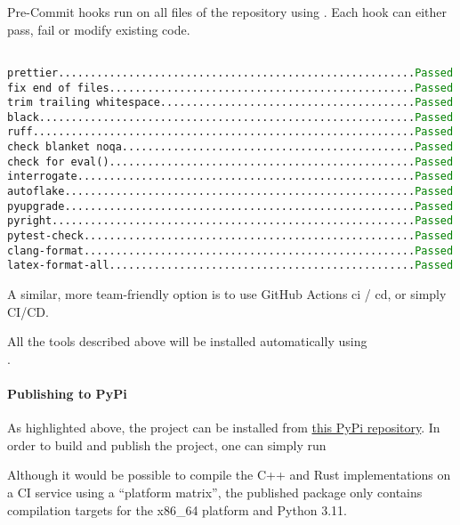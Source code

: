 \begin{table}
  \centering
  \caption{Pre-Commit hooks run on all files of the repository using . Each hook can either pass, fail or modify existing code.}
  \texttt{
    \hspace*{-1em} prettier........................................................\textcolor{green}{Passed} \\
    fix end of files................................................\textcolor{green}{Passed} \\
    trim trailing whitespace........................................\textcolor{green}{Passed} \\
    black...........................................................\textcolor{green}{Passed} \\
    ruff............................................................\textcolor{green}{Passed} \\
    check blanket noqa..............................................\textcolor{green}{Passed} \\
    check for eval()................................................\textcolor{green}{Passed} \\
    interrogate.....................................................\textcolor{green}{Passed} \\
    autoflake.......................................................\textcolor{green}{Passed} \\
    pyupgrade.......................................................\textcolor{green}{Passed} \\
    pyright.........................................................\textcolor{green}{Passed} \\
    pytest-check....................................................\textcolor{green}{Passed} \\
    clang-format....................................................\textcolor{green}{Passed} \\
    latex-format-all................................................\textcolor{green}{Passed}
  }
\end{table}

A similar, more team-friendly option is to use GitHub Actions \gls{ci} / \gls{cd}, or simply CI/CD.

All the tools described above will be installed automatically using \\
.

\paragraph{Publishing to PyPi}
As highlighted above, the project can be installed from \href{https://pypi.org/project/melon-scheduler/}{this PyPi repository}.
In order to build and publish the project, one can simply run


Although it would be possible to compile the C++ and Rust implementations on a CI service using a ``platform matrix'', the published package only contains compilation targets for the x86\_64 platform and Python 3.11.
